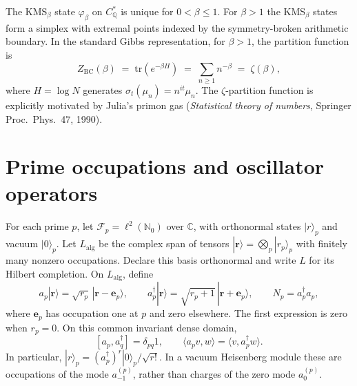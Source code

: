 \begin{theorem}
\label{v4-arith:thm:BC-KMS}
The KMS\({}_{\beta}\) state \(\varphi_{\beta}\)
on \(C_{\mathbb{Q}}^{*}\) is unique for \(0<\beta\leq1\). For
\(\beta>1\) the KMS\({}_{\beta}\) states form a simplex with extremal
points indexed by the symmetry-broken arithmetic boundary. In the
standard Gibbs representation, for \(\beta>1\), the partition function is
\begin{equation}
Z_{\mathrm{BC}}(\beta)\;=\;\mathrm{tr}(e^{-\beta H})\;=\;\sum_{n\geq 1}n^{-\beta}\;=\;\zeta(\beta),
\end{equation}
where \(H=\log N\) generates \(\sigma_{t}(\mu_{n})=n^{it}\mu_{n}\). The
\(\zeta\)-partition function is explicitly motivated by Julia's
primon gas (\emph{Statistical theory of numbers}, Springer
Proc.~Phys.~47, 1990).
\end{theorem}

\section{Prime occupations and oscillator operators}
\label{v4-arith:cs:type-mismatch}

\begin{definition}
\label{v4-arith:def:zero-mode-lattice}
For each prime $p$, let $\mathscr F_p=\ell^2(\mathbb N_0)$ over
$\mathbb C$, with orthonormal states $|r\rangle_p$ and vacuum $|0\rangle_p$.
Let $L_{\mathrm{alg}}$ be the complex span of tensors
$|\mathbf r\rangle=\bigotimes_p|r_p\rangle_p$ with finitely many
nonzero occupations. Declare this basis orthonormal and write $L$
for its Hilbert completion.
On $L_{\mathrm{alg}}$, define
\[
 a_p|\mathbf r\rangle
   =\sqrt{r_p}\,|\mathbf r-\mathbf e_p\rangle,\qquad
 a_p^\dagger|\mathbf r\rangle
   =\sqrt{r_p+1}\,|\mathbf r+\mathbf e_p\rangle,\qquad
 N_p=a_p^\dagger a_p,
\]
where $\mathbf e_p$ has occupation one at $p$ and zero elsewhere.
The first expression is zero when $r_p=0$.
On this common invariant dense domain,
\[
 [a_p,a_q^\dagger]=\delta_{pq}1,\qquad
 \langle a_pv,w\rangle=\langle v,a_p^\dagger w\rangle.
\]
In particular,
$|r\rangle_p=(a_p^\dagger)^r|0\rangle_p/\sqrt{r!}$.
In a vacuum Heisenberg module these are occupations of the
mode $a_{-1}^{(p)}$, rather than charges of the zero mode $a_0^{(p)}$.
\end{definition}

